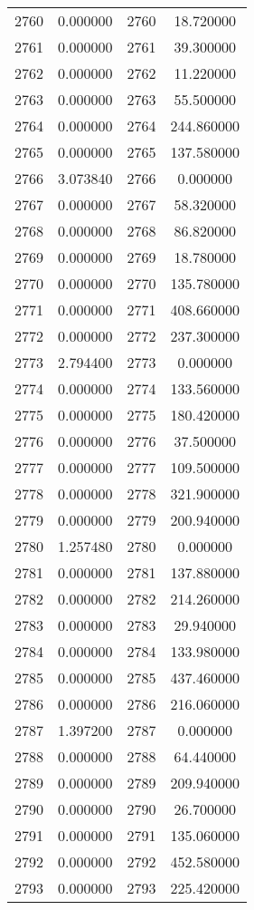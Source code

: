 \documentclass[12pt]{article}
\begin{document}
\begin{longtable}{@{}cccc@{}}
2760 & 0.000000 & 2760 & 18.720000 \\
2761 & 0.000000 & 2761 & 39.300000 \\
2762 & 0.000000 & 2762 & 11.220000 \\
2763 & 0.000000 & 2763 & 55.500000 \\
2764 & 0.000000 & 2764 & 244.860000 \\
2765 & 0.000000 & 2765 & 137.580000 \\
2766 & 3.073840 & 2766 & 0.000000 \\
2767 & 0.000000 & 2767 & 58.320000 \\
2768 & 0.000000 & 2768 & 86.820000 \\
2769 & 0.000000 & 2769 & 18.780000 \\
2770 & 0.000000 & 2770 & 135.780000 \\
2771 & 0.000000 & 2771 & 408.660000 \\
2772 & 0.000000 & 2772 & 237.300000 \\
2773 & 2.794400 & 2773 & 0.000000 \\
2774 & 0.000000 & 2774 & 133.560000 \\
2775 & 0.000000 & 2775 & 180.420000 \\
2776 & 0.000000 & 2776 & 37.500000 \\
2777 & 0.000000 & 2777 & 109.500000 \\
2778 & 0.000000 & 2778 & 321.900000 \\
2779 & 0.000000 & 2779 & 200.940000 \\
2780 & 1.257480 & 2780 & 0.000000 \\
2781 & 0.000000 & 2781 & 137.880000 \\
2782 & 0.000000 & 2782 & 214.260000 \\
2783 & 0.000000 & 2783 & 29.940000 \\
2784 & 0.000000 & 2784 & 133.980000 \\
2785 & 0.000000 & 2785 & 437.460000 \\
2786 & 0.000000 & 2786 & 216.060000 \\
2787 & 1.397200 & 2787 & 0.000000 \\
2788 & 0.000000 & 2788 & 64.440000 \\
2789 & 0.000000 & 2789 & 209.940000 \\
2790 & 0.000000 & 2790 & 26.700000 \\
2791 & 0.000000 & 2791 & 135.060000 \\
2792 & 0.000000 & 2792 & 452.580000 \\
2793 & 0.000000 & 2793 & 225.420000 \\

\end{longtable}
\end{document}
